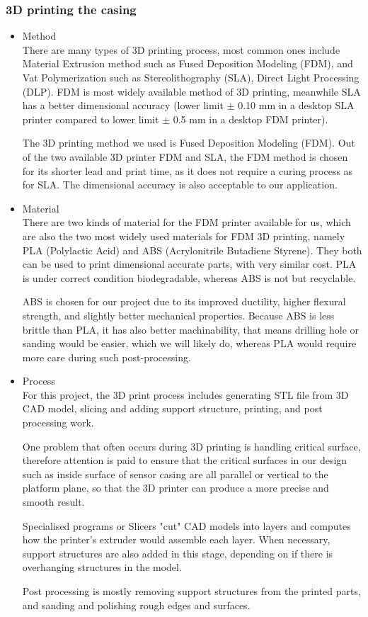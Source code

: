\subsubsection{3D printing the casing}
\begin{itemize}
    \item Method\\ 
    There are many types of 3D printing process, most common ones include Material Extrusion method such as Fused Deposition Modeling (FDM), and Vat Polymerization such as Stereolithography (SLA), Direct Light Processing (DLP). FDM is most widely available method of 3D printing, meanwhile SLA has a better dimensional accuracy (lower limit $\pm$ 0.10 mm in a desktop SLA printer compared to lower limit $\pm$ 0.5 mm in a desktop FDM printer).

    The 3D printing method we used is Fused Deposition Modeling (FDM). Out of the two available 3D printer FDM and SLA, the FDM method is chosen for its shorter lead and print time, as it does not require a curing process as for SLA. The dimensional accuracy is also acceptable to our application.
    
    

    \item Material\\ 
    There are two kinds of material for the FDM printer available for us, which are also the two most widely used materials for FDM 3D printing, namely PLA (Polylactic Acid) and ABS (Acrylonitrile Butadiene Styrene). They both can be used to print dimensional accurate parts, with very similar cost. PLA is under correct condition biodegradable, whereas ABS is not but recyclable.

    ABS is chosen for our project due to its improved ductility, higher flexural strength, and slightly better mechanical properties. Because ABS is less brittle than PLA, it has also better machinability, that means drilling hole or sanding would be easier, which we will likely do, whereas PLA would require more care during such post-processing.

    \item Process\\ 
    For this project, the 3D print process includes generating STL file from 3D CAD model, slicing and adding support structure, printing, and post processing work.

    One problem that often occurs during 3D printing is handling critical surface, therefore attention is paid to ensure that the critical surfaces in our design such as inside surface of sensor casing are all parallel or vertical to the platform plane, so that the 3D printer can produce a more precise and smooth result.

    Specialised programs or Slicers "cut" CAD models into layers and computes how the printer's extruder would assemble each layer. When necessary, support structures are also added in this stage, depending on if there is overhanging structures in the model.

    Post processing is mostly removing support structures from the printed parts, and sanding and polishing rough edges and surfaces.
\end{itemize}

\FloatBarrier
\vspace{1cm}

